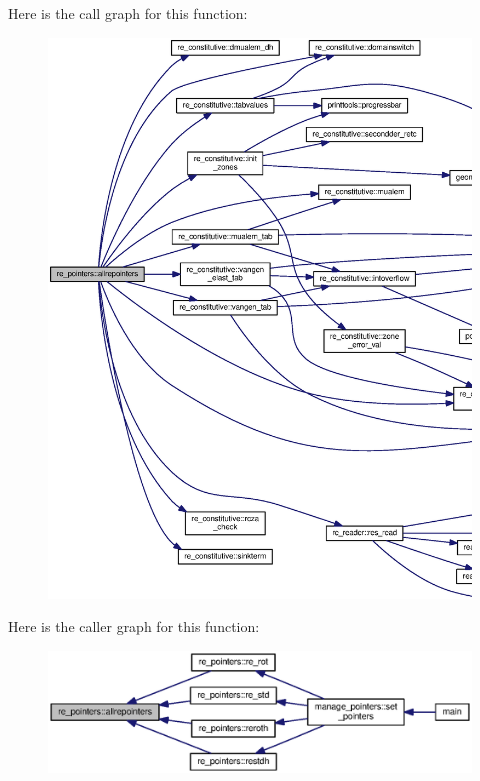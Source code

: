 Here is the call graph for this function\+:\nopagebreak
\begin{figure}[H]
\begin{center}
\leavevmode
\includegraphics[width=350pt]{namespacere__pointers_a5f39d856da70973c02dcc8ed10844884_cgraph}
\end{center}
\end{figure}




Here is the caller graph for this function\+:\nopagebreak
\begin{figure}[H]
\begin{center}
\leavevmode
\includegraphics[width=350pt]{namespacere__pointers_a5f39d856da70973c02dcc8ed10844884_icgraph}
\end{center}
\end{figure}


